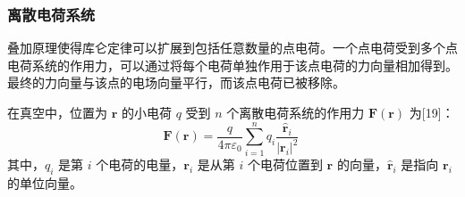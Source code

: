\subsubsection{离散电荷系统}  
叠加原理使得库仑定律可以扩展到包括任意数量的点电荷。一个点电荷受到多个点电荷系统的作用力，可以通过将每个电荷单独作用于该点电荷的力向量相加得到。最终的力向量与该点的电场向量平行，而该点电荷已被移除。

在真空中，位置为 \(\mathbf{r}\) 的小电荷 \(q\) 受到 \(n\) 个离散电荷系统的作用力 \(\mathbf{F}(\mathbf{r})\) 为[19]：
\[
\mathbf{F}(\mathbf{r}) = \frac{q}{4\pi \varepsilon_0} \sum_{i=1}^{n} q_i \frac{\hat{\mathbf{r}}_i}{|\mathbf{r}_i|^2}~
\]
其中，\(q_i\) 是第 \(i\) 个电荷的电量，\(\mathbf{r}_i\) 是从第 \(i\) 个电荷位置到 \(\mathbf{r}\) 的向量，\(\hat{\mathbf{r}}_i\) 是指向 \(\mathbf{r}_i\) 的单位向量。